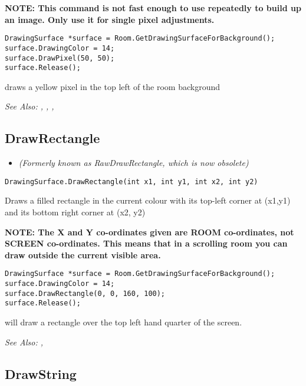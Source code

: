 \bf{NOTE:} This command is not fast enough to use repeatedly to build up an image. Only
use it for single pixel adjustments.

\begin{verbatim}
DrawingSurface *surface = Room.GetDrawingSurfaceForBackground();
surface.DrawingColor = 14;
surface.DrawPixel(50, 50);
surface.Release();
\end{verbatim}
draws a yellow pixel in the top left of the room background

\it{See Also:} ,
,
,


\subsection{DrawRectangle}\label{DrawingSurface.DrawRectangle}%

\begin{itemize}
\item \it{(Formerly known as RawDrawRectangle, which is now obsolete)}
\end{itemize}

\begin{verbatim}
DrawingSurface.DrawRectangle(int x1, int y1, int x2, int y2)
\end{verbatim}
Draws a filled rectangle in the current colour with its top-left corner
at (x1,y1) and its bottom right corner at (x2, y2)

\bf{NOTE:} The X and Y co-ordinates given are ROOM co-ordinates, not SCREEN co-ordinates.
This means that in a scrolling room you can draw outside the current visible area.

\begin{verbatim}
DrawingSurface *surface = Room.GetDrawingSurfaceForBackground();
surface.DrawingColor = 14;
surface.DrawRectangle(0, 0, 160, 100);
surface.Release();
\end{verbatim}
will draw a rectangle over the top left hand quarter of the screen.

\it{See Also:} ,


\subsection{DrawString}\label{DrawingSurface.DrawString}%

